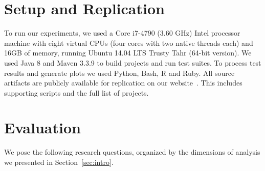 \section{Setup and Replication}
\label{sec:setup}

To run our experiments, we used a Core i7-4790 (3.60 GHz) Intel processor
machine with eight virtual CPUs (four cores with two native threads each) and
16GB of memory, running Ubuntu 14.04 LTS Trusty Tahr (64-bit version).  We
used Java 8 and Maven 3.3.9 to build projects and run test
suites. To process test results and generate plots we used Python,
Bash, R and Ruby.  All source artifacts are publicly available for
replication on our website~\cite{ourwebpage}.  This includes supporting
scripts and the full list of projects.


\section{Evaluation}
\label{sec:eval}

We pose the following research questions, organized by the dimensions
of analysis we presented in Section~\ref{sec:intro}.

\newcommand{\numRQFeasibilityOne}{RQ1}
\newcommand{\RQFeasibilityOne}{How prevalent are time-consuming
  test suites\Comment{ in open-source projects}?}

\newcommand{\numRQFeasibilityTwo}{RQ2}
\newcommand{\RQFeasibilityTwo}{How is time distributed across test cases?}

\newcommand{\numRQAdoptionOne}{RQ3}
\newcommand{\RQAdoptionOne}{How popular is test suite
  parallelization\Comment{ in open-source projects}?}

\newcommand{\numRQAdoptionTwo}{RQ4}
\newcommand{\RQAdoptionTwo}{What are the main reasons that prevent developers
  from using test suite parallelization?}

\newcommand{\numRQSpeedupOne}{RQ5}
\newcommand{\RQSpeedupOne}{What are the speedups obtained with parallelization
  (in projects that actually use it)?}

\newcommand{\numRQSpeedupTwo}{RQ6}
\newcommand{\RQSpeedupTwo}{How test execution scales with the number of
  available CPUs?}

\newcommand{\numRQIssuesOne}{RQ7}
\newcommand{\RQIssuesOne}{How parallel execution configurations affect testing
  costs and flakiness?}

